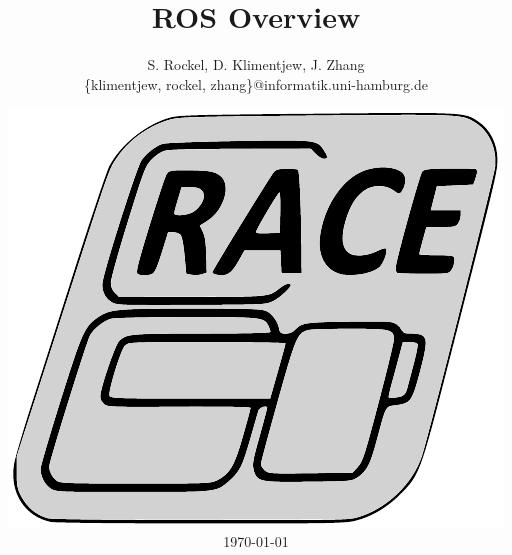 




\title[ROS Overview]{ROS Overview}


\author[S. Rockel, D. Klimentjew, J. Zhang]{S. Rockel, D. Klimentjew, J. Zhang\textbf{}\\
{\small \{klimentjew, rockel, zhang\}@informatik.uni-hamburg.de\vspace{-1em}
}}


\date{\includegraphics[width=0.13\paperwidth]{images/RACE-Logo-Slanting-PROPOSAL-grayscale}\\
\today}

\makebeamertitle


